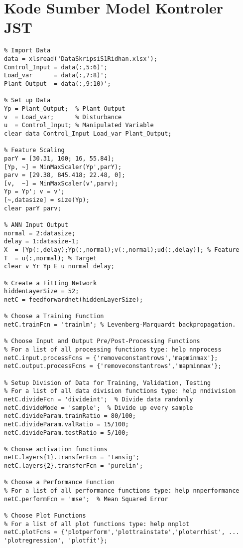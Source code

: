\section{Kode Sumber Model Kontroler JST}
\begin{lstlisting}
% Import Data
data = xlsread('DataSkripsiS1Ridhan.xlsx');
Control_Input = data(:,5:6)';
Load_var      = data(:,7:8)';
Plant_Output  = data(:,9:10)';

% Set up Data
Yp = Plant_Output;  % Plant Output
v  = Load_var;      % Disturbance
u  = Control_Input; % Manipulated Variable
clear data Control_Input Load_var Plant_Output;

% Feature Scaling
parY = [30.31, 100; 16, 55.84];
[Yp, ~] = MinMaxScaler(Yp',parY);
parv = [29.38, 845.418; 22.48, 0];
[v,  ~] = MinMaxScaler(v',parv);
Yp = Yp'; v = v';
[~,datasize] = size(Yp);
clear parY parv;

% ANN Input Output
normal = 2:datasize;
delay = 1:datasize-1;
X  = [Yp(:,delay);Yp(:,normal);v(:,normal);ud(:,delay)]; % Feature
T  = u(:,normal); % Target
clear v Yr Yp E u normal delay;

% Create a Fitting Network
hiddenLayerSize = 52;
netC = feedforwardnet(hiddenLayerSize);

% Choose a Training Function
netC.trainFcn = 'trainlm'; % Levenberg-Marquardt backpropagation.

% Choose Input and Output Pre/Post-Processing Functions
% For a list of all processing functions type: help nnprocess
netC.input.processFcns = {'removeconstantrows','mapminmax'};
netC.output.processFcns = {'removeconstantrows','mapminmax'};

% Setup Division of Data for Training, Validation, Testing
% For a list of all data division functions type: help nndivision
netC.divideFcn = 'divideint';  % Divide data randomly
netC.divideMode = 'sample';  % Divide up every sample
netC.divideParam.trainRatio = 80/100;
netC.divideParam.valRatio = 15/100;
netC.divideParam.testRatio = 5/100;

% Choose activation functions
netC.layers{1}.transferFcn = 'tansig';
netC.layers{2}.transferFcn = 'purelin';

% Choose a Performance Function
% For a list of all performance functions type: help nnperformance
netC.performFcn = 'mse';  % Mean Squared Error

% Choose Plot Functions
% For a list of all plot functions type: help nnplot
netC.plotFcns = {'plotperform','plottrainstate','ploterrhist', ...
'plotregression', 'plotfit'};


\end{lstlisting}
